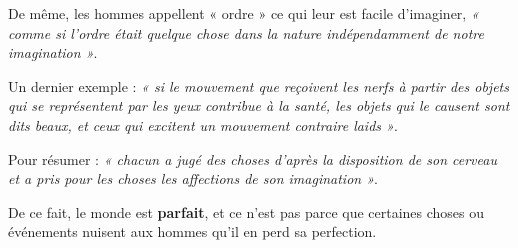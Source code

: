 De même, les hommes appellent « ordre » ce qui leur est facile d’imaginer,
{\it « comme si l’ordre était quelque chose dans la nature indépendamment de notre
imagination »}.

Un dernier exemple : {\it « si le mouvement que reçoivent les nerfs à partir des
objets qui se représentent par les yeux contribue à la santé, les objets qui
le causent sont dits beaux, et ceux qui excitent un mouvement contraire laids »}.

Pour résumer : {\it « chacun a jugé des choses d’après la disposition de son cerveau
et a pris pour les choses les affections de son imagination »}.

\vspace{0.5cm}
De ce fait, le monde est {\bf parfait}, et ce n’est pas parce que certaines choses
ou événements nuisent aux hommes qu’il en perd sa perfection.

